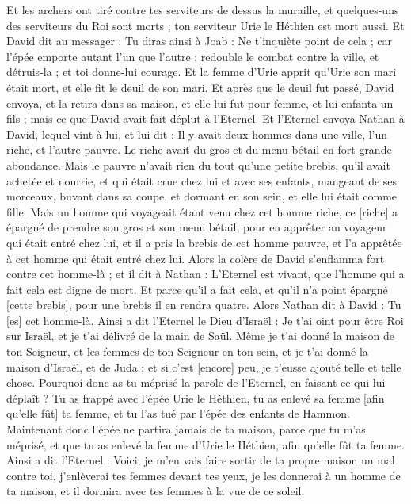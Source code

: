 \begin{multicols}{2}
Et les archers ont tiré contre tes serviteurs de dessus la muraille, et quelques-uns des serviteurs du Roi sont morts ; ton serviteur Urie le Héthien est mort aussi.
Et David dit au messager : Tu diras ainsi à Joab : Ne t'inquiète point de cela ; car l'épée emporte autant l'un que l'autre ; redouble le combat contre la ville, et détruis-la ; et toi donne-lui courage.
Et la femme d'Urie apprit qu'Urie son mari était mort, et elle fit le deuil de son mari.
Et après que le deuil fut passé, David envoya, et la retira dans sa maison, et elle lui fut pour femme, et lui enfanta un fils ; mais ce que David avait fait déplut à l'Eternel.
\VerseOne{}Et l'Eternel envoya Nathan à David, lequel vint à lui, et lui dit : Il y avait deux hommes dans une ville, l'un riche, et l'autre pauvre.
Le riche avait du gros et du menu bétail en fort grande abondance.
Mais le pauvre n'avait rien du tout qu'une petite brebis, qu'il avait achetée et nourrie, et qui était crue chez lui et avec ses enfants, mangeant de ses morceaux, buvant dans sa coupe, et dormant en son sein, et elle lui était comme fille.
Mais un homme qui voyageait étant venu chez cet homme riche, ce [riche] a épargné de prendre son gros et son menu bétail, pour en apprêter au voyageur qui était entré chez lui, et il a pris la brebis de cet homme pauvre, et l'a apprêtée à cet homme qui était entré chez lui.
Alors la colère de David s'enflamma fort contre cet homme-là ; et il dit à Nathan : L'Eternel est vivant, que l'homme qui a fait cela est digne de mort.
Et parce qu'il a fait cela, et qu'il n'a point épargné [cette brebis], pour une brebis il en rendra quatre.
Alors Nathan dit à David : Tu [es] cet homme-là. Ainsi a dit l'Eternel le Dieu d'Israël : Je t'ai oint pour être Roi sur Israël, et je t'ai délivré de la main de Saül.
Même je t'ai donné la maison de ton Seigneur, et les femmes de ton Seigneur en ton sein, et je t'ai donné la maison d'Israël, et de Juda ; et si c'est [encore] peu, je t'eusse ajouté telle et telle chose.
Pourquoi donc as-tu méprisé la parole de l'Eternel, en faisant ce qui lui déplaît ? Tu as frappé avec l'épée Urie le Héthien, tu as enlevé sa femme [afin qu'elle fût] ta femme, et tu l'as tué par l'épée des enfants de Hammon.
Maintenant donc l'épée ne partira jamais de ta maison, parce que tu m'as méprisé, et que tu as enlevé la femme d'Urie le Héthien, afin qu'elle fût ta femme.
Ainsi a dit l'Eternel : Voici, je m'en vais faire sortir de ta propre maison un mal contre toi, j'enlèverai tes femmes devant tes yeux, je les donnerai à un homme de ta maison, et il dormira avec tes femmes à la vue de ce soleil.

\end{multicols}
